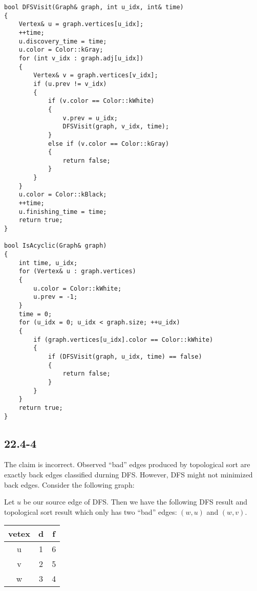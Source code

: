 \begin{verbatim}
bool DFSVisit(Graph& graph, int u_idx, int& time)
{
    Vertex& u = graph.vertices[u_idx];
    ++time;
    u.discovery_time = time;
    u.color = Color::kGray;
    for (int v_idx : graph.adj[u_idx])
    {
        Vertex& v = graph.vertices[v_idx];
        if (u.prev != v_idx)
        {
            if (v.color == Color::kWhite)
            {
                v.prev = u_idx;
                DFSVisit(graph, v_idx, time);
            }
            else if (v.color == Color::kGray)
            {
                return false;
            }
        }
    }
    u.color = Color::kBlack;
    ++time;
    u.finishing_time = time;
    return true;
}

bool IsAcyclic(Graph& graph)
{
    int time, u_idx;
    for (Vertex& u : graph.vertices)
    {
        u.color = Color::kWhite;
        u.prev = -1;
    }
    time = 0;
    for (u_idx = 0; u_idx < graph.size; ++u_idx)
    {
        if (graph.vertices[u_idx].color == Color::kWhite)
        {
            if (DFSVisit(graph, u_idx, time) == false)
            {
                return false;
            }
        }
    }
    return true;
}
\end{verbatim}

\subsection*{22.4-4}

The claim is incorrect.
Observed ``bad'' edges produced by topological sort 
are exactly back edges classified durning DFS. 
However, DFS might not minimized back edges.
Consider the following graph:


Let $u$ be our source edge of DFS.
Then we have the following DFS result and topological sort result
which only has two ``bad'' edges: $(w,u)$ and $(w,v)$.

\begin{tabular}{c|c|c}
    vetex & d & f \\
    \hline
    u & 1 & 6 \\
    v & 2 & 5 \\
    w & 3 & 4 \\
\end{tabular}

